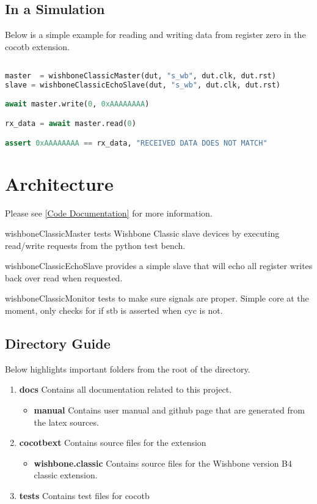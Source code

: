\subsection{In a Simulation}
\par
Below is a simple example for reading and writing data from register zero in the cocotb extension.
\begin{lstlisting}[language=Python]

master  = wishboneClassicMaster(dut, "s_wb", dut.clk, dut.rst)
slave = wishboneClassicEchoSlave(dut, "s_wb", dut.clk, dut.rst)

await master.write(0, 0xAAAAAAAA)

rx_data = await master.read(0)

assert 0xAAAAAAAA == rx_data, "RECEIVED DATA DOES NOT MATCH"

\end{lstlisting}

\section{Architecture}

Please see \ref{Code Documentation} for more information.

\par
wishboneClassicMaster tests Wishbone Classic slave devices by executing read/write requests from the python test bench.
\par
wishboneClassicEchoSlave provides a simple slave that will echo all register writes back over read when requested.
\par
wishboneClassicMonitor tests to make sure signals are proper. Simple core at the moment, only checks for if stb is
asserted when cyc is not.

\subsection{Directory Guide}

\par
Below highlights important folders from the root of the directory.

\begin{enumerate}
  \item \textbf{docs} Contains all documentation related to this project.
    \begin{itemize}
      \item \textbf{manual} Contains user manual and github page that are generated from the latex sources.
    \end{itemize}
  \item \textbf{cocotbext} Contains source files for the extension
    \begin{itemize}
      \item \textbf{wishbone.classic} Contains source files for the Wishbone version B4 classic extension.
    \end{itemize}
  \item \textbf{tests} Contains test files for cocotb
\end{enumerate}


